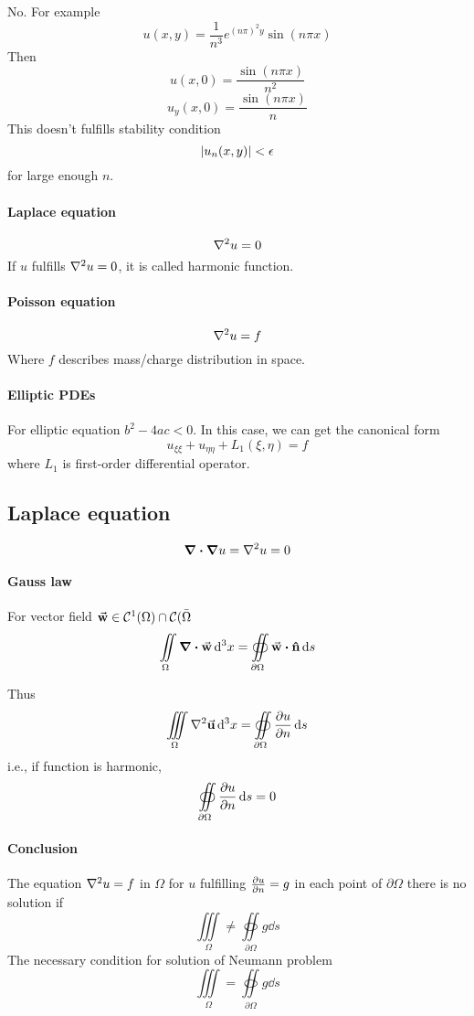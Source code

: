 No. For example
$$u(x,y) = \frac{1}{n^3}e^{(n\pi)^2 y}\sin (n\pi x)$$
Then
$$u(x,0) = \frac{\sin(n\pi x)}{n^2}$$
$$u_y(x,0) = \frac{\sin(n\pi x)}{n}$$
This doesn't fulfills stability condition 
$$\abs{u_n(x,y)}<\epsilon$$
for large enough $n$.
\paragraph{Laplace equation}
$$\laplacian{u} = 0$$
If $u$ fulfills $\laplacian{u} = 0$, it is called harmonic function.
\paragraph{Poisson equation}
$$\laplacian{u} = f$$
Where $f$ describes mass/charge distribution in space.
\paragraph{Elliptic PDEs}
For elliptic equation $b^2-4ac<0$.
In this case, we can get the canonical form
$$u_{\xi\xi} + u_{\eta\eta} + L_1(\xi, \eta) = f$$
where $L_1$ is first-order differential operator.
\subsection{Laplace equation}
$$\div{\grad{u}} = \laplacian{u} = 0$$
\paragraph{Gauss law}
For vector field $\va{w} \in \mathcal{C}^1(\Omega) \cap \mathcal{C}(\bar{\Omega}$ 
$$\iint\limits_{\Omega} \div{\va{w}} \dd[3]{x} =  \oiint\limits_{\partial \Omega} \va{w} \vdot \vu{n} \dd{s}$$

Thus
$$\iiint\limits_{\Omega} \laplacian{\va{u}} \dd[3]{x} = \oiint\limits_{\partial \Omega} \pdv{u}{n} \dd{s}$$
i.e., if function is harmonic,
$$\oiint\limits_{\partial \Omega}  \pdv{u}{n} \dd{s} = 0$$

\paragraph{Conclusion}
The equation $\laplacian{u} = f $ in $\Omega$ for $u$ fulfilling $\pdv{u}{n}  = g$ in each point of  $\partial \Omega$ there is no solution if
$$\iiint\limits_{\Omega} \neq \oiint\limits_{\partial \Omega} g \dd{s}$$
The necessary condition for solution of Neumann problem 
$$\iiint\limits_{\Omega} = \oiint\limits_{\partial \Omega} g \dd{s}$$

